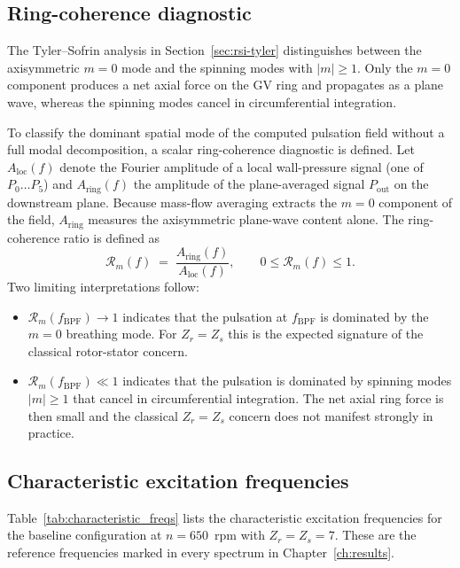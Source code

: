 \subsection{Ring-coherence diagnostic}
\label{sec:spec-coherence}

The Tyler--Sofrin analysis in Section~\ref{sec:rsi-tyler}
distinguishes between the axisymmetric $m=0$ mode and the spinning
modes with $|m|\geq 1$. Only the $m=0$ component produces a net axial
force on the \ac{GV} ring and propagates as a plane wave, whereas
the spinning modes cancel in circumferential integration.

To classify the dominant spatial mode of the computed pulsation field
without a full modal decomposition, a scalar ring-coherence
diagnostic is defined. Let $A_{\mathrm{loc}}(f)$ denote the Fourier
amplitude of a local wall-pressure signal (one of $P_0 \ldots P_5$)
and $A_{\mathrm{ring}}(f)$ the amplitude of the plane-averaged signal
$P_{\mathrm{out}}$ on the downstream plane. Because mass-flow
averaging extracts the $m=0$ component of the field,
$A_{\mathrm{ring}}$ measures the axisymmetric plane-wave content
alone. The ring-coherence ratio is defined as
\begin{equation}
    \mathcal{R}_m(f) \;=\;
    \frac{A_{\mathrm{ring}}(f)}{A_{\mathrm{loc}}(f)},
    \qquad 0 \leq \mathcal{R}_m(f) \leq 1. \label{eq:coherence}
\end{equation}
Two limiting interpretations follow:
\begin{itemize}
  \item $\mathcal{R}_m(f_{\mathrm{BPF}}) \to 1$ indicates that the
        pulsation at $f_{\mathrm{BPF}}$ is dominated by the $m=0$
        breathing mode. For $Z_r = Z_s$ this is the expected
        signature of the classical rotor-stator concern.
  \item $\mathcal{R}_m(f_{\mathrm{BPF}}) \ll 1$ indicates that the
        pulsation is dominated by spinning modes $|m|\geq 1$ that
        cancel in circumferential integration. The net axial ring
        force is then small and the classical $Z_r = Z_s$ concern
        does not manifest strongly in practice.
\end{itemize}

\subsection{Characteristic excitation frequencies}
\label{sec:spec-peaks}

Table~\ref{tab:characteristic_freqs} lists the characteristic
excitation frequencies for the baseline configuration at
$n = 650$~rpm with $Z_r = Z_s = 7$. These are the reference
frequencies marked in every spectrum in Chapter~\ref{ch:results}.

